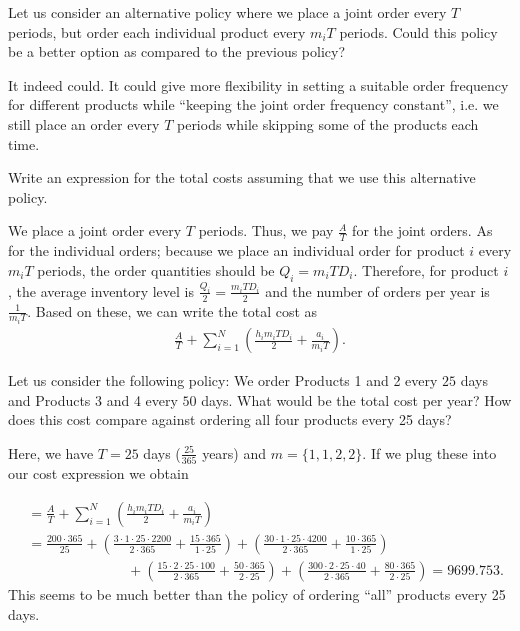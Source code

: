 \begin{exercise}
Let us consider an alternative policy where we place a joint order every $T$ periods, but order each individual product every $m_i T$ periods. Could this policy be a better option as compared to the previous policy?


\begin{solution}
It indeed could. It could give more flexibility in setting a suitable order frequency for different products while ``keeping the joint order frequency constant'', i.e. we still place an order every $T$ periods while skipping some of the products each time.
\end{solution}
\end{exercise}

\begin{exercise}
Write an expression for the total costs assuming that we use this alternative policy.


\begin{solution}
We place a joint order every $T$ periods. Thus, we pay $\frac{A}{T}$ for the joint orders. As for the individual orders; because  we place an individual order for product $i$ every $m_i T$ periods, the order quantities should be $Q_i = m_i T D_i$. Therefore, for product $i$, the average inventory level is $\frac{Q_i}{2}=\frac{m_i T D_i}{2}$ and the number of orders per year is $\frac{1}{m_i T}$. Based on these, we can write the total cost as
\begin{align*}
\frac{A}{T} + \sum_{i=1}^N \left(\frac{h_i m_i T D_i}{2} + \frac{a_i}{m_i T}\right).
\end{align*}
\end{solution}
\end{exercise}

\begin{exercise}
Let us consider the following policy: We order Products 1 and 2 every $25$ days and Products 3 and 4 every $50$ days. What would be the total cost per year? How does this cost compare against ordering all four products every 25 days?


\begin{solution}
Here, we have $T=25$ days ($\frac{25}{365}$ years) and $m=\{1,1,2,2\}$. If we plug these into our cost expression we obtain

\begin{align*}
& = \frac{A}{T} + \sum_{i=1}^N \left(\frac{h_i m_i T D_i}{2} + \frac{a_i}{m_i T}\right) \\
& = \frac{200\cdot 365}{25} 
+ \left(\frac{3   \cdot 1 \cdot 25 \cdot 2200}{2 \cdot 365} + \frac{15 \cdot 365}{1 \cdot 25} \right) 
+ \left(\frac{30  \cdot 1 \cdot 25 \cdot 4200}{2 \cdot 365} + \frac{10 \cdot 365}{1 \cdot 25} \right) \\
& \hspace{3cm} 
+ \left(\frac{15  \cdot 2 \cdot 25 \cdot 100 }{2 \cdot 365} + \frac{50 \cdot 365}{2 \cdot 25} \right) 
+ \left(\frac{300 \cdot 2 \cdot 25 \cdot 40  }{2 \cdot 365} + \frac{80 \cdot 365}{2 \cdot 25} \right) = 9699.753.
\end{align*}
This seems to be much better than the policy of ordering ``all'' products every 25 days. 
\end{solution}
\end{exercise}



